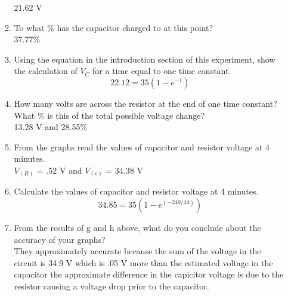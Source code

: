 \documentclass[a4paper]{article}
\begin{document}
\begin{enumerate}
\begin{enumerate}
        21.62 V
        \item To what \% has the capacitor charged to at this point? \\
        37.77\%
        \item Using the equation in the introduction section of this experiment, show the calculation of $V_{C}$ for a time equal to one time constant. \\
        \[22.12 = 35(1-e^{-1})\]
        \item How many volts are across the resistor at the end of one time constant? What \% is this of the total possible voltage change? \\
        13.28 V and 28.55\%
        \item From the graphs read the values of capacitor and resistor voltage at 4 minutes. \\
        $V_{(R)}$ = .52 V and $V_{(c)}$ = 34.38 V
        \item Calculate the values of capacitor and resistor voltage at 4 minutes. \\
        \[34.85 = 35(1-e^{(-240/44)})\]
        \item From the results of g and h above, what do you conclude about the accuracy of your graphs? \\
        They approximately accurate because the sum of the voltage in the circuit is 34.9 V which is .05 V more than the estimated voltage in the capacitor the approximate difference in the capicitor voltage is due to the resistor causing a voltage drop prior to the capacitor. 
    \end{enumerate}
\end{enumerate}
\end{document}
